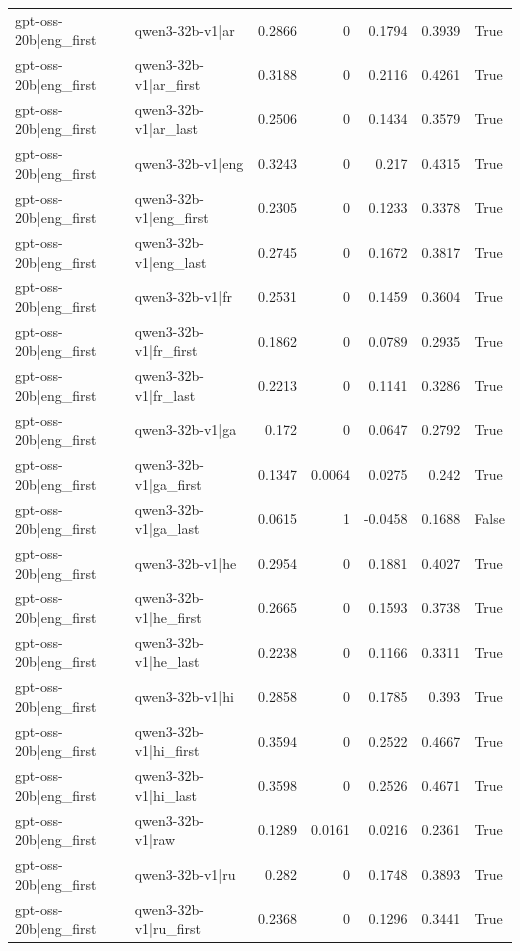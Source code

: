 \begin{table}
\begin{tabular}{l l r r r r l}
gpt-oss-20b|eng_first & qwen3-32b-v1|ar & 0.2866 & 0 & 0.1794 & 0.3939 & True \\
gpt-oss-20b|eng_first & qwen3-32b-v1|ar_first & 0.3188 & 0 & 0.2116 & 0.4261 & True \\
gpt-oss-20b|eng_first & qwen3-32b-v1|ar_last & 0.2506 & 0 & 0.1434 & 0.3579 & True \\
gpt-oss-20b|eng_first & qwen3-32b-v1|eng & 0.3243 & 0 & 0.217 & 0.4315 & True \\
gpt-oss-20b|eng_first & qwen3-32b-v1|eng_first & 0.2305 & 0 & 0.1233 & 0.3378 & True \\
gpt-oss-20b|eng_first & qwen3-32b-v1|eng_last & 0.2745 & 0 & 0.1672 & 0.3817 & True \\
gpt-oss-20b|eng_first & qwen3-32b-v1|fr & 0.2531 & 0 & 0.1459 & 0.3604 & True \\
gpt-oss-20b|eng_first & qwen3-32b-v1|fr_first & 0.1862 & 0 & 0.0789 & 0.2935 & True \\
gpt-oss-20b|eng_first & qwen3-32b-v1|fr_last & 0.2213 & 0 & 0.1141 & 0.3286 & True \\
gpt-oss-20b|eng_first & qwen3-32b-v1|ga & 0.172 & 0 & 0.0647 & 0.2792 & True \\
gpt-oss-20b|eng_first & qwen3-32b-v1|ga_first & 0.1347 & 0.0064 & 0.0275 & 0.242 & True \\
gpt-oss-20b|eng_first & qwen3-32b-v1|ga_last & 0.0615 & 1 & -0.0458 & 0.1688 & False \\
gpt-oss-20b|eng_first & qwen3-32b-v1|he & 0.2954 & 0 & 0.1881 & 0.4027 & True \\
gpt-oss-20b|eng_first & qwen3-32b-v1|he_first & 0.2665 & 0 & 0.1593 & 0.3738 & True \\
gpt-oss-20b|eng_first & qwen3-32b-v1|he_last & 0.2238 & 0 & 0.1166 & 0.3311 & True \\
gpt-oss-20b|eng_first & qwen3-32b-v1|hi & 0.2858 & 0 & 0.1785 & 0.393 & True \\
gpt-oss-20b|eng_first & qwen3-32b-v1|hi_first & 0.3594 & 0 & 0.2522 & 0.4667 & True \\
gpt-oss-20b|eng_first & qwen3-32b-v1|hi_last & 0.3598 & 0 & 0.2526 & 0.4671 & True \\
gpt-oss-20b|eng_first & qwen3-32b-v1|raw & 0.1289 & 0.0161 & 0.0216 & 0.2361 & True \\
gpt-oss-20b|eng_first & qwen3-32b-v1|ru & 0.282 & 0 & 0.1748 & 0.3893 & True \\
gpt-oss-20b|eng_first & qwen3-32b-v1|ru_first & 0.2368 & 0 & 0.1296 & 0.3441 & True \\

\end{tabular}
\end{table}
